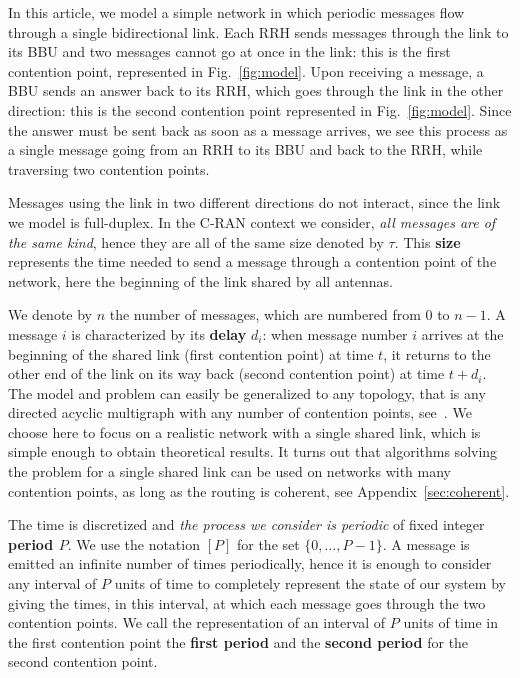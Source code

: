 \documentclass[a4paper,UKenglish,cleveref, autoref, thm-restate]{lipics-v2019}
\begin{document}
In this article, we model a simple network in which periodic messages flow through a single bidirectional link. Each RRH sends messages through the link to its
BBU and two messages cannot go at once in the link: this is the first contention point, represented in Fig.~\ref{fig:model}. Upon receiving a message, a BBU sends an answer back to its RRH, which goes through the link in the other direction: this is the second contention point represented in Fig.~\ref{fig:model}. Since the answer must be sent back as soon as a message arrives, we see this process as a single message going from an RRH to its BBU and back to the RRH, while traversing two contention points. 

Messages using the link in two different directions do not interact, since the link we model is full-duplex. In the C-RAN context we consider, \emph{all messages are of the same kind}, hence they are all of the same size denoted by $\tau$. This \textbf{size} represents the time needed to send a message through a contention point of the network, here the beginning of the link shared by all antennas.

 We denote by $n$ the number of messages, which are numbered from $0$ to $n-1$. A message $i$ is characterized by its \textbf{delay} $d_i$: when message number $i$ arrives at the beginning of the shared link (first contention point) at time $t$, it returns to the other end of the link on its way back (second contention point) at time $t + d_i$. The model and problem can easily be generalized to any topology, that is any directed acyclic multigraph with any number of contention points, see~\cite{bartharxiv2018deterministic}. We choose here to focus on a realistic network with a single shared link, which is simple enough to obtain theoretical results. It turns out that algorithms solving the problem for a single shared link can be used on networks with many contention points, as long as the routing is coherent, see Appendix~\ref{sec:coherent}. 

The time is discretized and \emph{the process we consider is periodic} of fixed integer \textbf{period $P$}. We use the notation $[P]$ for the set $\{0,\dots,P-1\}$. A message is emitted an infinite number of times periodically, hence it is enough to consider any interval of $P$ units of time to completely represent the state of our system by giving the times, in this interval, at which each message goes through the two contention points. We call the representation of an interval of $P$ units of time in the first contention point the \textbf{first period} and the \textbf{second period} for the second contention point. 
\end{document}
